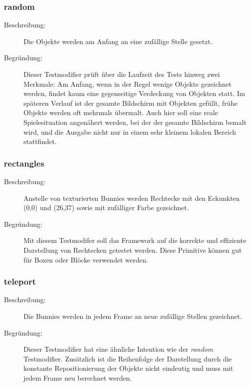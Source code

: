 \subsubsection{random} 
\begin{description}
\item[Beschreibung:] Die Objekte werden am Anfang an eine zufällige Stelle gesetzt. \\
\item[Begründung:] Dieser Testmodifier prüft über die Laufzeit des Tests hinweg zwei Merkmale: Am Anfang, wenn in der Regel wenige Objekte gezeichnet werden, findet kaum eine gegenseitige Verdeckung von Objekten statt. Im späteren Verlauf ist der gesamte Bildschirm mit Objekten gefüllt, frühe Objekte werden oft mehrmals übermalt. Auch hier soll eine reale Spielesituation angenähert werden, bei der der gesamte Bildschirm bemalt wird, und die Ausgabe nicht nur in einem sehr kleinem lokalen Bereich stattfindet.
\end{description}

\subsubsection{rectangles}
\begin{description}
\item[Beschreibung:] Anstelle von texturierten Bunnies werden Rechtecke mit den Eckunkten (0,0) und (26,37) sowie mit zufälliger Farbe gezeichnet. \\
\item[Begründung:] Mit diesem Testmodifer soll das Framework auf die korrekte und effiziente Darstellung von Rechtecken getestet werden. Diese Primitive können gut für Boxen oder Blöcke verwendet werden.
\end{description}

\subsubsection{teleport}
\begin{description}
\item[Beschreibung:] Die Bunnies werden in jedem Frame an neue zufällige Stellen gezeichnet. \\
\item[Begründung:] Dieser Testmodifier hat eine ähnliche Intention wie der \emph{random} Testmodifier. Zusätzlich ist die Reihenfolge der Darstellung durch die konstante Repositionierung der Objekte nicht eindeutig und muss mit jedem Frame neu berechnet werden.
\end{description}

